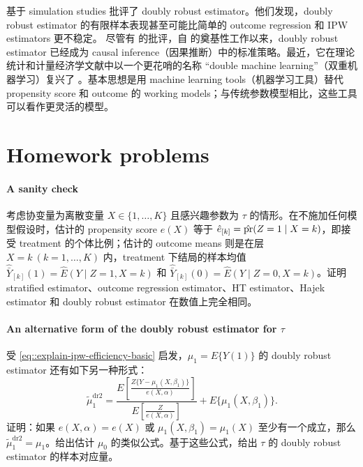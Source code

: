 \citet{kang2007demystifying} 基于 simulation studies 批评了 doubly robust estimator。他们发现，doubly robust estimator 的有限样本表现甚至可能比简单的 outcome regression 和 IPW estimators 更不稳定。
尽管有 \citet{kang2007demystifying} 的批评，自 \citet{scharfstein1999adjusting} 的奠基性工作以来，doubly robust estimator 已经成为 causal inference（因果推断）中的标准策略。最近，它在理论统计和计量经济学文献中以一个更花哨的名称 ``double machine learning''（双重机器学习）复兴了 \citep{chernozhukov2018double}。基本思想是用 machine learning tools（机器学习工具）替代 propensity score 和 outcome 的 working models；与传统参数模型相比，这些工具可以看作更灵活的模型。





\section{Homework problems}



 \paragraph{A sanity check}\label{hw::discreteX-obs}
考虑协变量为离散变量 $X \in \{1, \ldots, K\}$ 且感兴趣参数为 $\tau$ 的情形。在不施加任何模型假设时，估计的 propensity score $\hat{e}(X)$ 等于 $\hat{e}_{[k]} = \hat{\textup{pr}}(Z=1\mid X=k) $，即接受 treatment 的个体比例；估计的 outcome means 则是在层 $X=k\ (k=1, \ldots, K)$ 内，treatment 下结局的样本均值 $\hat{\bar{Y}}_{[k]}(1)  = \hat{E}(Y\mid Z=1, X=k) $ 和 $\hat{\bar{Y}}_{[k]}(0)  = \hat{E}(Y\mid Z=0, X=k) $。证明 stratified estimator、outcome regression estimator、HT estimator、Hajek estimator 和 doubly robust estimator 在数值上完全相同。
 


\paragraph{An alternative form of the doubly robust estimator for $\tau$}\label{hw::alternative-dr2-robins}

受 \eqref{eq::explain-ipw-efficiency-basic} 启发，$\mu_1 = E\{ Y(1) \} $ 的 doubly robust estimator 还有如下另一种形式：
$$
\tilde{\mu}_1^\text{dr2} = 
\frac{ E\left[   \frac{Z\{ Y-\mu_1(X,\beta_1) \}}{  e(X,\alpha) } \right] }{E\left[   \frac{Z }{  e(X,\alpha) } \right]} 
 + E\{ \mu_1(X, \beta_1)  \} .
$$
证明：如果 $e(X,\alpha)  = e(X)$ 或 $\mu_1(X, \beta_1) =  \mu_1(X)$ 至少有一个成立，那么 $\tilde{\mu}_1^\text{dr2} = \mu_1$。给出估计 $\mu_0$ 的类似公式。基于这些公式，给出 $\tau$ 的 doubly robust estimator 的样本对应量。

